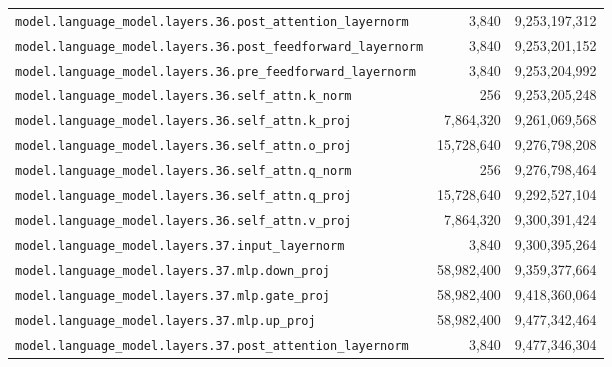 \documentclass[10pt,a4paper]{article}
\theoremstyle{definition}
\begin{document}
\begin{appendices}
\begin{longtable}{p{9.5cm}rr}
\texttt{model.\allowbreak{}language\_model.\allowbreak{}layers.\allowbreak{}36.\allowbreak{}post\_attention\_layernorm} & 3,840 & 9,253,197,312 \\
\texttt{model.\allowbreak{}language\_model.\allowbreak{}layers.\allowbreak{}36.\allowbreak{}post\_feedforward\_layernorm} & 3,840 & 9,253,201,152 \\
\texttt{model.\allowbreak{}language\_model.\allowbreak{}layers.\allowbreak{}36.\allowbreak{}pre\_feedforward\_layernorm} & 3,840 & 9,253,204,992 \\
\texttt{model.\allowbreak{}language\_model.\allowbreak{}layers.\allowbreak{}36.\allowbreak{}self\_attn.\allowbreak{}k\_norm} & 256 & 9,253,205,248 \\
\texttt{model.\allowbreak{}language\_model.\allowbreak{}layers.\allowbreak{}36.\allowbreak{}self\_attn.\allowbreak{}k\_proj} & 7,864,320 & 9,261,069,568 \\
\texttt{model.\allowbreak{}language\_model.\allowbreak{}layers.\allowbreak{}36.\allowbreak{}self\_attn.\allowbreak{}o\_proj} & 15,728,640 & 9,276,798,208 \\
\texttt{model.\allowbreak{}language\_model.\allowbreak{}layers.\allowbreak{}36.\allowbreak{}self\_attn.\allowbreak{}q\_norm} & 256 & 9,276,798,464 \\
\texttt{model.\allowbreak{}language\_model.\allowbreak{}layers.\allowbreak{}36.\allowbreak{}self\_attn.\allowbreak{}q\_proj} & 15,728,640 & 9,292,527,104 \\
\texttt{model.\allowbreak{}language\_model.\allowbreak{}layers.\allowbreak{}36.\allowbreak{}self\_attn.\allowbreak{}v\_proj} & 7,864,320 & 9,300,391,424 \\
\texttt{model.\allowbreak{}language\_model.\allowbreak{}layers.\allowbreak{}37.\allowbreak{}input\_layernorm} & 3,840 & 9,300,395,264 \\
\texttt{model.\allowbreak{}language\_model.\allowbreak{}layers.\allowbreak{}37.\allowbreak{}mlp.\allowbreak{}down\_proj} & 58,982,400 & 9,359,377,664 \\
\texttt{model.\allowbreak{}language\_model.\allowbreak{}layers.\allowbreak{}37.\allowbreak{}mlp.\allowbreak{}gate\_proj} & 58,982,400 & 9,418,360,064 \\
\texttt{model.\allowbreak{}language\_model.\allowbreak{}layers.\allowbreak{}37.\allowbreak{}mlp.\allowbreak{}up\_proj} & 58,982,400 & 9,477,342,464 \\
\texttt{model.\allowbreak{}language\_model.\allowbreak{}layers.\allowbreak{}37.\allowbreak{}post\_attention\_layernorm} & 3,840 & 9,477,346,304 \\

\end{longtable}
\end{appendices}
\end{document}
